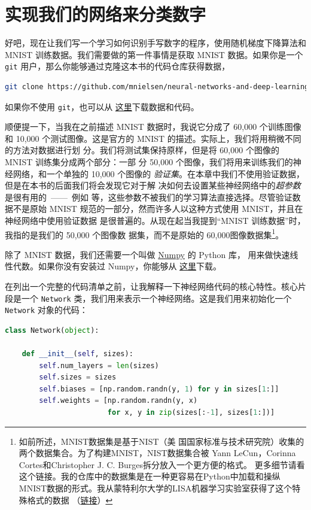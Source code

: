 \section{实现我们的网络来分类数字}
\label{sec:implementing_our_network_to_classify_digits}

好吧，现在让我们写一个学习如何识别手写数字的程序，使用随机梯度下降算法和 MNIST
训练数据。我们需要做的第一件事情是获取 MNIST 数据。如果你是一个 \lstinline!git!
用户，那么你能够通过克隆这本书的代码仓库获得数据，

\begin{lstlisting}[language=sh]
git clone https://github.com/mnielsen/neural-networks-and-deep-learning.git
\end{lstlisting}

如果你不使用 \lstinline!git!，也可以从%
\href{https://github.com/mnielsen/neural-networks-and-deep-learning/archive/master.zip}{
  这里}下载数据和代码。

顺便提一下，当我在之前描述 MNIST 数据时，我说它分成了 60,000 个训练图像和 10,000
个测试图像。这是官方的 MNIST 的描述。实际上，我们将用稍微不同的方法对数据进行划
分。我们将测试集保持原样，但是将 60,000 个图像的 MNIST 训练集分成两个部分：一部
分 50,000 个图像，我们将用来训练我们的神经网络，和一个单独的 10,000 个图像的%
\emph{验证集}。在本章中我们不使用验证数据，但是在本书的后面我们将会发现它对于解
决如何去设置某些神经网络中的\emph{超参数}是很有用的~——~例如%
\learningrate{}等，这些参数不被我们的学习算法直接选择。尽管验证数据不是原始
MNIST 规范的一部分，然而许多人以这种方式使用 MNIST，并且在神经网络中使用验证数据
是很普遍的。从现在起当我提到“MNIST 训练数据”时，我指的是我们的 50,000 个图像数
据集，而不是原始的 60,000图像数据集\footnote{如前所述，MNIST数据集是基于NIST（美
    国国家标准与技术研究院）收集的两个数据集合。为了构建MNIST，NIST数据集合被
  Yann LeCun，Corinna Cortes和Christopher J. C. Burges拆分放入一个更方便的格式。
  更多细节请看这个链接。我的仓库中的数据集是在一种更容易在Python中加载和操纵
  MNIST数据的形式。我从蒙特利尔大学的LISA机器学习实验室获得了这个特殊格式的数据
  （\href{http://www.deeplearning.net/tutorial/gettingstarted.html}{链接}）}。

除了 MNIST 数据，我们还需要一个叫做 \href{http://numpy.org/}{Numpy} 的 Python 库，
用来做快速线性代数。如果你没有安装过 Numpy，你能够从%
\href{http://www.scipy.org/install.html}{这里}下载。

在列出一个完整的代码清单之前，让我解释一下神经网络代码的核心特性。核心片段是一个
\lstinline!Network! 类，我们用来表示一个神经网络。这是我们用来初始化一个
\lstinline!Network! 对象的代码：
\begin{lstlisting}[language=Python]
class Network(object):

	def __init__(self, sizes):
		self.num_layers = len(sizes)
		self.sizes = sizes
		self.biases = [np.random.randn(y, 1) for y in sizes[1:]]
		self.weights = [np.random.randn(y, x)
						for x, y in zip(sizes[:-1], sizes[1:])]
\end{lstlisting}

